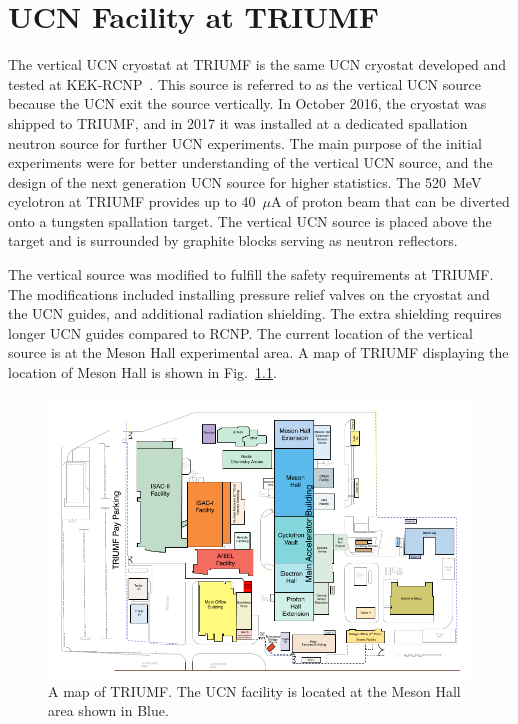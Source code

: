\chapter{UCN Facility at TRIUMF\label{chap:UCNattriumf}}


The vertical UCN cryostat at TRIUMF is the same UCN cryostat developed
and tested at
KEK-RCNP~\cite{masuda2002spallation,masuda2012spallation}. This source
is referred to as the vertical UCN source because the UCN exit the
source vertically.  In October 2016, the cryostat was shipped to
TRIUMF, and in 2017 it was installed at a dedicated spallation neutron
source for further UCN experiments. The main purpose of the initial
experiments were for better understanding of the vertical UCN source,
and the design of the next generation UCN source for higher
statistics. The 520~MeV cyclotron at TRIUMF provides up to 40~$\mu$A
of proton beam that can be diverted onto a tungsten spallation
target. The vertical UCN source is placed above the target and is
surrounded by graphite blocks serving as neutron reflectors.


The vertical source was modified to fulfill the safety requirements at
TRIUMF. The modifications included installing pressure relief valves
on the cryostat and the UCN guides, and additional radiation
shielding. The extra shielding requires longer UCN guides compared to
RCNP. The current location of the vertical source is at the Meson Hall
experimental area. A map of TRIUMF displaying the location of Meson
Hall is shown in Fig.~\ref{fig:sitemap}.

\begin{figure}[h!]
  \centering
  \includegraphics[width=1.0\textwidth]{sitemap.png}
  \caption[A map of TRIUMF]{A map of TRIUMF. The UCN facility is
    located at the Meson Hall area shown in Blue.}
  \label{fig:sitemap}
\end{figure}


